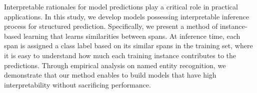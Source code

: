 Interpretable rationales for model predictions play a critical role in practical applications. In this study, we develop models possessing interpretable inference process for structured prediction. Specifically, we present a method of instance-based learning that learns similarities between spans. At inference time, each span is assigned a class label based on its similar spans in the training set, where it is easy to understand how much each training instance contributes to the predictions. Through empirical analysis on named entity recognition, we demonstrate that our method enables to build models that have high interpretability without sacrificing performance.
